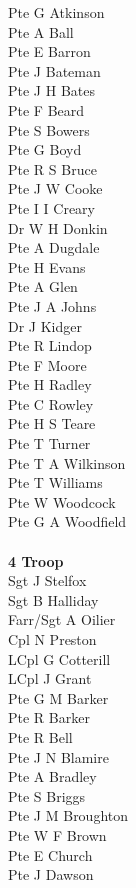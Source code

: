 \begin{multicols}{2}
  Pte G Atkinson \\
  Pte A Ball \\
  Pte E Barron \\
  Pte J Bateman \\
  Pte J H Bates \\
  Pte F Beard \\
  Pte S Bowers \\
  Pte G Boyd \\
  Pte R S Bruce \\
  Pte J W Cooke \\
  Pte I I Creary \\
  Dr W H Donkin \\
  Pte A Dugdale \\
  Pte H Evans \\
  Pte A Glen \\
  Pte J A Johns \\
  Dr J Kidger \\
  Pte R Lindop \\
  Pte F Moore \\
  Pte H Radley \\
  Pte C Rowley \\
  Pte H S Teare \\
  Pte T Turner \\
  Pte T A Wilkinson \\
  Pte T Williams \\
  Pte W Woodcock \\
  Pte G A Woodfield \\
  \\
  \textbf{4 Troop} \\
  Sgt J Stelfox \\
  Sgt B Halliday \\
  Farr/Sgt A Oilier \\
  Cpl N Preston \\
  LCpl G Cotterill \\
  LCpl J Grant \\
  Pte G M Barker \\
  Pte R Barker \\
  Pte R Bell \\
  Pte J N Blamire \\
  Pte A Bradley \\
  Pte S Briggs \\
  Pte J M Broughton \\
  Pte W F Brown \\
  Pte E Church \\
  Pte J Dawson \\

\end{multicols}

